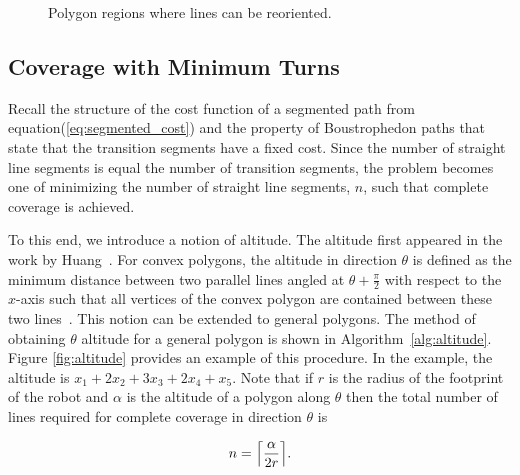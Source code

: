 \documentclass[../main.tex]{subfiles}
\begin{document}
\begin{figure}
	\centering
	\begin{subfigure}{0.5\linewidth}
		\centering
		
	\end{subfigure}%
	\begin{subfigure}{0.5\linewidth}
		\centering
		
	\end{subfigure}
	\caption{Polygon regions where lines can be reoriented.}
	\label{fig:reorder_regions}
\end{figure}


\subsection{Coverage with Minimum Turns}
\label{subsection:coverage_with_minimum_turns}

Recall the structure of the cost function of a segmented path from equation(\ref{eq:segmented_cost}) and the property of Boustrophedon paths that state that the transition segments have a fixed cost. Since the number of straight line segments is equal the number of transition segments, the problem becomes one of minimizing the number of straight line segments, $n$, such that complete coverage is achieved.

To this end, we introduce a notion of altitude. The altitude first appeared in the work by Huang~\cite{Huang2001optimal}. For convex polygons, the altitude in direction $\theta$ is defined as the minimum distance between two parallel lines angled at $\theta+\frac{\pi}{2}$ with respect to the $x$-axis such that all vertices of the convex polygon are contained between these two lines~\cite{Huang2001optimal}. This notion can be extended to general polygons. The method of obtaining $\theta$ altitude for a general polygon is shown in Algorithm~\ref{alg:altitude}. Figure \ref{fig:altitude} provides an example of this procedure. In the example, the altitude is $x_1 + 2x_2 + 3x_3 + 2x_4 + x_5$. Note that if $r$ is the radius of the footprint of the robot and $\alpha$ is the altitude of a polygon along $\theta$ then the total number of lines required for complete coverage in direction $\theta$ is

\begin{equation}
	n=\ceil*{\frac{\alpha}{2r}}.
\end{equation}
\end{document}
